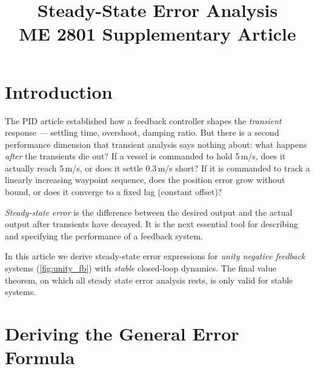 \documentclass[12pt]{article}
\title{Steady-State Error Analysis\\[0.5em]
\large ME 2801 Supplementary Article}
\author{}
\date{}
\begin{document}
\maketitle
\tableofcontents
\newpage

\section{Introduction}
\label{sec:intro}

The PID article established how a feedback controller shapes the \emph{transient}
response --- settling time, overshoot, damping ratio.  But there is a second
performance dimension that transient analysis says nothing about: what happens
\emph{after} the transients die out?  If a vessel is commanded to hold 5\,m/s,
does it actually reach 5\,m/s, or does it settle 0.3\,m/s short?  If it is
commanded to track a linearly increasing waypoint sequence, does the position
error grow without bound, or does it converge to a fixed lag (constant offset)?

\emph{Steady-state error} is the difference between the desired output and the
actual output after transients have decayed.  It is the next essential tool for
describing and specifying the performance of a feedback system.


In this article we derive steady-state error expressions for
\emph{unity negative feedback} systems (\cref{fig:unity_fb}) with \emph{stable}
closed-loop dynamics.  The final value theorem, on which all steady state error analysis rests, is only valid
for stable systems. 

\section{Deriving the General Error Formula}
\label{sec:derivation}
\end{document}
